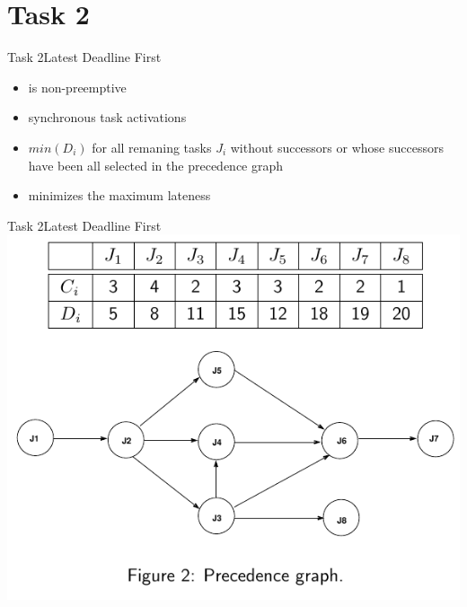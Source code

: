 
\section{Task 2}

\setcounter{task}{1}

\begin{frame}{Task 2}{Latest Deadline First}
  \begin{requirements}
    \begin{itemize}
      \item is \alert{non-preemptive}
      \item \alert{synchronous task activations}
      \item $min(D_i)$ for all remaning tasks $J_i$ \alert{without successors} or \alert{whose successors} have been all selected in the \alert{precedence graph}
      \item \alert{minimizes} the \alert{maximum lateness}
    \end{itemize}
  \end{requirements}
\end{frame}

\begin{frame}{Task 2}{Latest Deadline First}
  \centering
  \includegraphics[height=0.7\paperheight]{./figures/2_tab_graph.png}
\end{frame}

